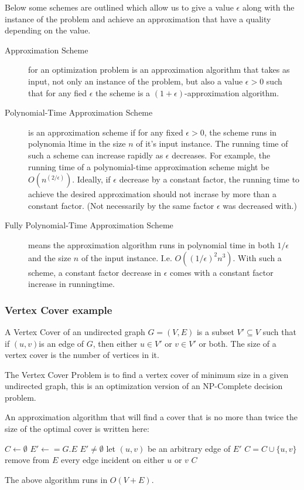 Below some schemes are outlined which allow us to give a value $\epsilon$ along
with the instance of the problem and achieve an approximation that have a
quality depending on the value.
\begin{description}
\item[Approximation Scheme] for an optimization problem is an approximation
  algorithm that takes as input, not only an instance of the problem, but also a
  value $\epsilon > 0$ such that for any fied $\epsilon$ the scheme is a
  $(1+\epsilon)$-approximation algorithm.

\item[Polynomial-Time Approximation Scheme] is an approximation scheme if for
  any fixed $\epsilon > 0$, the scheme runs in polynomia ltime in the size $n$
  of it's input instance. The running time of such a scheme can increase rapidly
  as $\epsilon$ decreases. For example, the running time of a polynomial-time
  approximation scheme might be $O(n^{(2/\epsilon)})$. Ideally, if $\epsilon$
  decrease by a constant factor, the running time to achieve the desired
  approximation should not incrase by more than a constant factor. (Not
  necessarily by the same factor $\epsilon$ was decreased with.)

\item[Fully Polynomial-Time Approximation Scheme] means the approximation
  algorithm runs in polynomial time in both $1/\epsilon$ and the size $n$ of the
  input instance. I.e. $O((1/\epsilon)^2n^3)$. With such a scheme, a constant
  factor decrease in $\epsilon$ comes with a constant factor increase in
  runningtime.
\end{description}


\subsubsection{Vertex Cover example}

A Vertex Cover of an undirected graph $G = (V,E)$ is a subset $V' \subseteq V$
such that if $(u,v)$is an edge of $G$, then either $u \in V'$ or $v \in V'$ or
both. The size of a vertex cover is the number of vertices in it.

The Vertex Cover Problem is to find a vertex cover of minimum size in a given
undirected graph, this is an optimization version of an NP-Complete decision
problem.

An approximation algorithm that will find a cover that is no more than twice the
size of the optimal cover is written here:
\begin{codebox}
\li $C \gets \emptyset$
\li $E' \gets = G.E$
\li \While $E' \neq \emptyset$ \Do
\li   let $(u,v)$ be an arbitrary edge of $E'$
\li   $C = C \cup \{u,v\}$
\li   remove from $E$ every edge incident on either $u$ or $v$ \End
\li \Return $C$
\end{codebox}
The above algorithm runs in $O(V+E)$.

